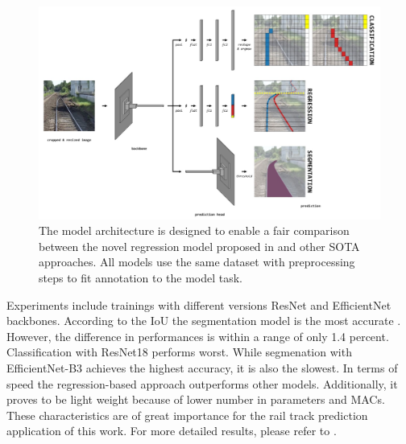 \begin{figure}[H]
    \centering
    \includegraphics[width=\linewidth]{PICs/Baselinepaper/tep-net_sota_models.jpg}
    \caption{The model architecture is designed to enable a fair comparison between the novel regression model proposed in \cite{tepNet2024} and other \ac{SOTA} approaches.
    All models use the same dataset with preprocessing steps to fit annotation to the model task.}
    \label{fig:TEP-Net_sota_models}
\end{figure}

Experiments include trainings with different versions ResNet and EfficientNet backbones.
According to the \ac{IoU} the segmentation  model is the most accurate \cite{tepNet2024}.
However, the difference in performances is within a range of only 1.4 percent.
Classification with ResNet18 performs worst.
While segmenation with EfficientNet-B3 achieves the highest accuracy, it is also the slowest.
In terms of speed the regression-based approach outperforms other models.
Additionally, it proves to be light weight because of lower number in parameters and \ac{MACs}.
These characteristics are of great importance for the rail track prediction application of this work.
For more detailed results, please refer to \cite{tepNet2024}.

